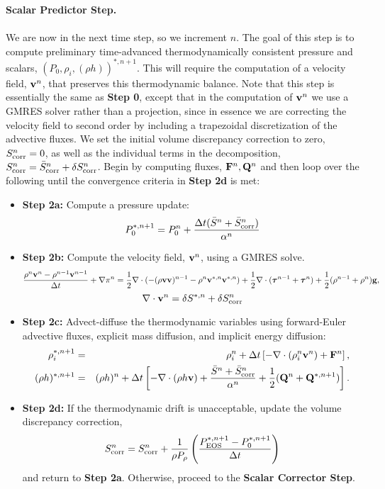 \documentclass[final]{siamltex}
\def\Fb {{\bf F}}
\def\gb {{\bf g}}
\def\Qb {{\bf Q}}
\def\vb {{\bf v}}
\def\taub   {\boldsymbol{\tau}}
\def\half   {\frac{1}{2}}
\begin{document}
{\bf Scalar Predictor Step.}\\ \\
We are now in the next time step, so we increment $n$.
The goal of this step is to compute preliminary time-advanced thermodynamically
consistent pressure and scalars, $(P_0,\rho_i,(\rho h))^{*,n+1}$.  This will
require the computation of a velocity field, $\vb^n$, that preserves this
thermodynamic balance.  Note that this step is essentially the same as
{\bf Step 0}, except that in the computation of $\vb^n$ we use a GMRES
solver rather than a projection, since in essence we are correcting the velocity
field to second order by including a trapezoidal discretization of the advective fluxes.
We set the initial volume discrepancy correction to zero, 
$S_{\rm corr}^n = 0$, as well as the individual terms in the decomposition,
$S_{\rm corr}^n = \bar{S}_{\rm corr}^n + \delta S_{\rm corr}^n$.
Begin by computing fluxes, $\Fb^n, \Qb^n$ and then loop over the following until 
the convergence criteria in {\bf Step 2d} is met:\\
\begin{itemize}
\item {\bf Step 2a:} Compute a pressure update:
\begin{equation}
P_0^{*,n+1} = P_0^n + \frac{\Delta t(\bar{S}^n + \bar{S}_{\rm corr}^n)}{\alpha^n}
\end{equation}
\item {\bf Step 2b:} Compute the velocity field, $\vb^n$, using a GMRES solve.
\begin{equation}
\frac{\rho^n\vb^n - \rho^{n-1}\vb^{n-1}}{\Delta t} + \nabla\pi^n = \half\nabla\cdot(-(\rho\vb\vb)^{n-1} - \rho^n\vb^{*,n}\vb^{*,n}) + \frac{1}{2}\nabla\cdot(\taub^{n-1} + \taub^n) + \frac{1}{2}(\rho^{n-1} + \rho^n)\gb,
\end{equation}
\begin{equation}
\nabla\cdot\vb^n = \delta S^{*,n} + \delta S_{\rm corr}^n
\end{equation}
\item {\bf Step 2c:} Advect-diffuse the thermodynamic variables using forward-Euler advective fluxes,
explicit mass diffusion, and implicit energy diffusion:
\begin{eqnarray}
\rho_i^{*,n+1} &=& \rho_i^n + \Delta t\left[-\nabla\cdot(\rho_i^n\vb^n) + \Fb^n\right], \\
(\rho h)^{*,n+1} &=& (\rho h)^n + \Delta t\left[-\nabla\cdot(\rho h\vb) + \frac{\bar{S}^n + \bar{S}_{\rm corr}^n}{\alpha^n} + \frac{1}{2}(\Qb^n + \Qb^{*,n+1})\right].\nonumber\\
\end{eqnarray}
\item {\bf Step 2d:} If the thermodynamic drift is unacceptable, update the volume 
discrepancy correction,
\begin{equation}
S_{\rm corr}^n = S_{\rm corr}^n + \frac{1}{\rho P_\rho}\left(\frac{P_{\rm EOS}^{*,n+1} - P_0^{*,n+1}}{\Delta t}\right)
\end{equation}
and return to {\bf Step 2a}.  Otherwise, proceed to the {\bf Scalar Corrector Step}.\\
\end{itemize}
\end{document}
